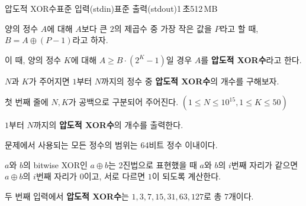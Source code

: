 \begin{problem}{압도적 XOR수}{표준 입력(stdin)}{표준 출력(stdout)}{1\,초}{512\,MB}

양의 정수 $A$에 대해 $A$보다 큰 $2$의 제곱수 중 가장 작은 값을 $P$라고 할 때, $B = A \oplus (P-1)$라고 하자.

이 때, 양의 정수 $K$에 대해 $A \geq B \cdot (2^K-1)$일 경우 $A$를 \textbf{압도적 XOR수}라고 한다.

$N$과 $K$가 주어지면 $1$부터 $N$까지의 정수 중 \textbf{압도적 XOR수}의 개수를 구해보자.

\InputFile
첫 번째 줄에 $N, K$가 공백으로 구분되어 주어진다. $(1 \leq N \leq 10^{15}, 1 \leq K \leq 50)$

\OutputFile
$1$부터 $N$까지의 \textbf{압도적 XOR수}의 개수를 출력한다. 

문제에서 사용되는 모든 정수의 범위는 64비트 정수 이내이다.

\Examples

\begin{example}
%
%
%
\end{example}

\Note
$a$와 $b$의 bitwise XOR인 $a \oplus b$는 2진법으로 표현했을 때 $a$와 $b$의 $i$번째 자리가 같으면 $a \oplus b$의 $i$번째 자리가 $0$이고, 서로 다르면 $1$이 되도록 계산한다.

두 번째 입력에서 \textbf{압도적 XOR수}는 $1, 3, 7, 15, 31, 63, 127$로 총 $7$개이다.

\end{problem}
